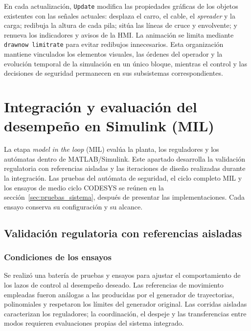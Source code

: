 \documentclass[a4paper,10pt,onecolumn,journal]{ieeeconf}
\numberwithin{equation}{section}
\begin{document}
En cada actualización, \texttt{Update} modifica las propiedades gráficas de los objetos existentes con las señales actuales: desplaza el carro, el cable, el \textit{spreader} y la carga; redibuja la altura de cada pila; sitúa las líneas de cruce y envolvente; y renueva los indicadores y avisos de la HMI. La animación se limita mediante \texttt{drawnow limitrate} para evitar redibujos innecesarios. Esta organización mantiene vinculados los elementos visuales, las órdenes del operador y la evolución temporal de la simulación en un único bloque, mientras el control y las decisiones de seguridad permanecen en sus subsistemas correspondientes.

\par
{}
\section{Integración y evaluación del desempeño en Simulink (MIL)}
\label{sec:integracion_p1}
La etapa \textit{model in the loop} (MIL) evalúa la planta, los reguladores y los autómatas dentro de MATLAB/Simulink. Este apartado desarrolla la validación regulatoria con referencias aisladas y las iteraciones de diseño realizadas durante la integración. Las pruebas del autómata de seguridad, el ciclo completo MIL y los ensayos de medio ciclo CODESYS se reúnen en la sección~\ref{sec:pruebas_sistema}, después de presentar las implementaciones. Cada ensayo conserva su configuración y su alcance.


\subsection{Validación regulatoria con referencias aisladas}
\label{subsec:validacion_regulatoria_MIL}
	\subsubsection{Condiciones de los ensayos}
	Se realizó una batería de pruebas y ensayos para ajustar el comportamiento de los lazos de control al desempeño deseado. Las referencias de movimiento empleadas fueron análogas a las producidas por el generador de trayectorias, polinomiales y respetaron los límites del generador original. Las corridas aisladas caracterizan los reguladores; la coordinación, el despeje y las transferencias entre modos requieren evaluaciones propias del sistema integrado.
	
\end{document}

